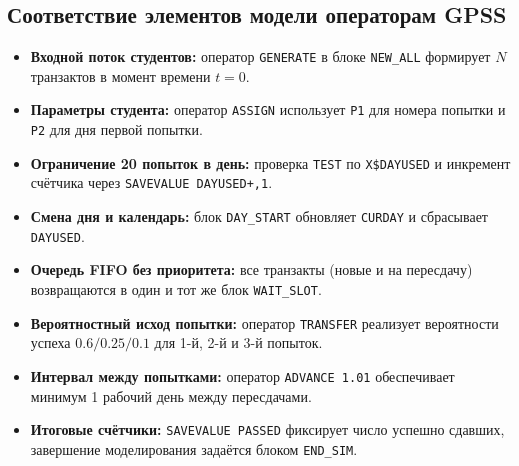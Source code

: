 \documentclass[a4paper, 14pt]{extarticle}
\begin{document}
\subsection{Соответствие элементов модели операторам GPSS}
\begin{itemize}
  \item \textbf{Входной поток студентов:} оператор \texttt{GENERATE} в блоке \texttt{NEW\_ALL} формирует $N$ транзактов в момент времени $t=0$.
  \item \textbf{Параметры студента:} оператор \texttt{ASSIGN} использует \texttt{P1} для номера попытки и \texttt{P2} для дня первой попытки.
  \item \textbf{Ограничение 20 попыток в день:} проверка \texttt{TEST} по \texttt{X\$DAYUSED} и инкремент счётчика через \texttt{SAVEVALUE DAYUSED+,1}.
  \item \textbf{Смена дня и календарь:} блок \texttt{DAY\_START} обновляет \texttt{CURDAY} и сбрасывает \texttt{DAYUSED}.
  \item \textbf{Очередь FIFO без приоритета:} все транзакты (новые и на пересдачу) возвращаются в один и тот же блок \texttt{WAIT\_SLOT}.
  \item \textbf{Вероятностный исход попытки:} оператор \texttt{TRANSFER} реализует вероятности успеха $0.6/0.25/0.1$ для 1-й, 2-й и 3-й попыток.
  \item \textbf{Интервал между попытками:} оператор \texttt{ADVANCE 1.01} обеспечивает минимум 1 рабочий день между пересдачами.
  \item \textbf{Итоговые счётчики:} \texttt{SAVEVALUE PASSED} фиксирует число успешно сдавших, завершение моделирования задаётся блоком \texttt{END\_SIM}.
\end{itemize}
\newenvironment{longlisting}{\captionsetup{type=listing}}{}
\end{document}
